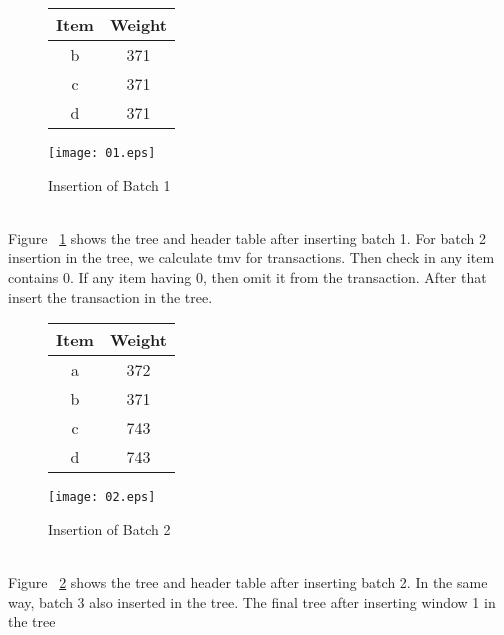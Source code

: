 \begin{figure}[ht]

{\centering
\begin{minipage}{.4\textwidth}
  \centering
  
	\begin{center}
	\begin{tabular}{ |c|c| } 
	\hline
	Item & Weight \\
	\hline
	b & 371\\
	c & 371\\
	d & 371\\
	\hline
	\end{tabular}
\end{center}  
\end{minipage}
\hfill
\begin{minipage}{0.60\textwidth}
  \centering
  \texttt{[image: 01.eps]}
\end{minipage}
}
\caption{Insertion of Batch 1}
\label{fig:insert1}
\end{figure} 
\\
Figure ~\ref{fig:insert1} shows the tree and header table after inserting batch 1.  For batch 2 insertion in the tree, we calculate tmv for transactions. Then check in any item contains 0. 
If any item having 0, then omit it from the transaction. After that insert the transaction in the tree.
\begin{figure}[ht]

{\centering
\begin{minipage}{.4\textwidth}
  \centering
  
	\begin{center}
	\begin{tabular}{ |c|c| } 
	\hline
	Item & Weight \\
	\hline
	a & 372\\
	b & 371\\
	c & 743\\
	d & 743\\
	\hline
	\end{tabular}
\end{center}  
\end{minipage}
\hfill
\begin{minipage}{0.60\textwidth}
  \centering
  \texttt{[image: 02.eps]}
\end{minipage}
}
\caption{Insertion of Batch 2}
\label{fig:insert2}
\end{figure} 
\\
Figure ~\ref{fig:insert2} shows the tree and header table after inserting batch 2. In the same way, batch 3 also inserted in the tree. The final tree after inserting window 1 in the tree 
